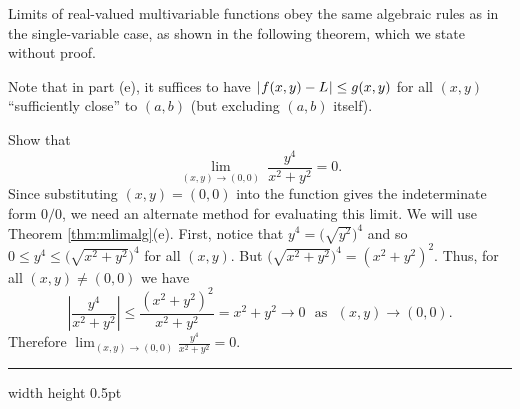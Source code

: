 Limits of real-valued multivariable functions obey the same algebraic rules as in the single-variable case, as shown
in the following theorem, which we state without proof.

Note that in part (e), it suffices to have $\lvert\mspace{1mu}f(x,y) - L\mspace{1mu}\rvert \le g(x,y)$ for all $(x,y)$ ``sufficiently
close'' to $(a,b)$ (but excluding $(a,b)$ itself).

\begin{exmp}\label{exmp:discont}
 Show that
 \begin{displaymath}
  \lim_{(x,y) \to (0,0)}~ \frac{y^4}{x^2 + y^2} = 0.
 \end{displaymath}
 Since substituting $(x,y) = (0,0)$ into the function gives the indeterminate form $0/0$, we need an alternate
 method for evaluating this limit. 
 We will use Theorem \ref{thm:mlimalg}(e). 
 First, notice that
 $y^4 = \bigl( \sqrt{y^2} \bigr)^4$ and so $0 \le y^4 \le \bigl( \sqrt{x^2 + y^2} \bigr)^4$ for all $(x,y)$. 
 But $\bigl( \sqrt{x^2 + y^2} \bigr)^4 = (x^2 + y^2)^2$. 
 Thus, for all $(x,y) \ne (0,0)$ we have
 \begin{displaymath}
  \left| \frac{y^4}{x^2 + y^2} \right| \le \frac{(x^2 + y^2)^2}{x^2 + y^2} = x^2 + y^2 \rightarrow 0 \text{~~as~~}
  (x,y) \rightarrow (0,0).
 \end{displaymath}
 Therefore $\displaystyle\lim_{(x,y) \to (0,0)} \frac{y^4}{x^2 + y^2} = 0$.
\end{exmp}
\hrule width \textwidth height 0.5pt
\medskip

